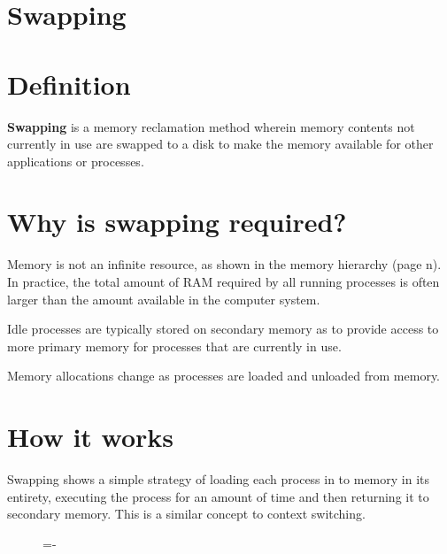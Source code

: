 \documentclass[a4paper]{systems-software}
\begin{document}
\section{Swapping}

\section*{Definition}

\textbf{Swapping} is a memory reclamation method wherein memory contents not currently in use are swapped to a disk to make the memory available for other applications or processes.


\section*{Why is swapping required?}

Memory is not an infinite resource, as shown in the memory hierarchy (page n). In practice, the total amount of RAM required by all running processes is often larger than the amount available in the computer system.

Idle processes are typically stored on secondary memory as to provide access to more primary memory for processes that are currently in use.

Memory allocations change as processes are loaded and unloaded from memory.


\section*{How it works}

Swapping shows a simple strategy of loading each process in to memory in its entirety, executing the process for an amount of time and then returning it to secondary memory. This is a similar concept to context switching.

\begin{figure}[H]
  \lineskip=-\fboxrule
\end{figure}
\end{document}
